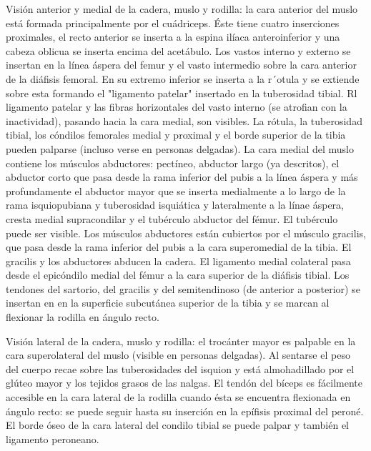 \documentclass[a4paper,12pt]{article} %
\begin{document}
Visión anterior y medial de la cadera, muslo y rodilla: la cara anterior del muslo está formada principalmente por el cuádriceps. Éste tiene cuatro inserciones proximales, el recto anterior se inserta a la espina ilíaca anteroinferior y una cabeza oblicua se inserta encima del acetábulo. Los vastos interno y externo se insertan en la línea áspera del femur y el vasto intermedio sobre la cara anterior de la diáfisis femoral. En su extremo inferior se inserta a la r´otula y se extiende sobre esta formando el "ligamento patelar" insertado en la tuberosidad tibial. Rl ligamento patelar y las fibras horizontales del vasto interno (se atrofian con la inactividad), pasando hacia la cara medial, son visibles. La rótula, la tuberosidad tibial, los cóndilos femorales medial y proximal y el borde superior de la tibia pueden palparse (incluso verse en personas delgadas).
La cara medial del muslo contiene los músculos abductores: pectíneo, abductor largo (ya descritos), el abductor corto que pasa desde la rama inferior del pubis a la línea áspera y más profundamente el abductor mayor que se inserta medialmente a lo largo de la rama isquiopubiana y tuberosidad isquiática y lateralmente a la línae áspera, cresta medial supracondilar y el tubérculo abductor del fémur. El tubérculo puede ser visible.
Los músculos abductores están cubiertos por el músculo gracilis, que pasa desde la rama inferior del pubis a la cara superomedial de la tibia. El gracilis y los abductores abducen la cadera.
El ligamento medial colateral pasa desde el epicóndilo medial del fémur a la cara superior de la diáfisis tibial. Los tendones del sartorio, del gracilis y del semitendinoso (de anterior a posterior) se insertan en en la superficie subcutánea superior de la tibia y se marcan al flexionar la rodilla en ángulo recto.

Visión lateral de la cadera, muslo y rodilla: el trocánter mayor es palpable en la cara superolateral del muslo (visible en personas delgadas). Al sentarse el peso del cuerpo recae sobre las tuberosidades del isquion y está almohadillado por el glúteo mayor y los tejidos grasos de las nalgas.
El tendón del bíceps es fácilmente accesible en la cara lateral de la rodilla cuando ésta se encuentra flexionada en ángulo recto: se puede seguir hasta su inserción en la epífisis proximal del peroné. El borde óseo de la cara lateral del condilo tibial se puede palpar y también el ligamento peroneano.
\end{document}

